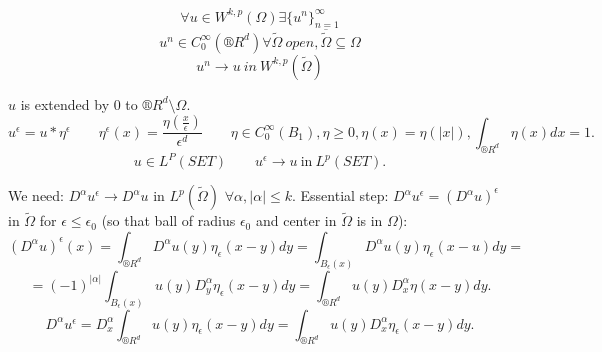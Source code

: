 \documentclass[12pt]{article}					%
\begin{document}

\begin{veta}
	$$ \forall u \in W^{k, p}(\Omega) \exists \{u^n\}_{n=1}^∞ $$
	$$ u^n \in C_0^∞(®R^d) \forall \tilde \Omega\ open, \overline{\tilde\Omega} \subseteq \Omega $$
	$$ u^n \rightarrow u\ in\ W^{k, p}(\tilde\Omega) $$

	\begin{dukazin}
		$u$ is extended by 0 to $®R^d \setminus \Omega$.
		$$ u^\epsilon = u * \eta^\epsilon \qquad \eta^\epsilon(x) = \frac{\eta(\frac{x}{\epsilon})}{\epsilon^d} \qquad \eta \in C_0^∞(B_1), \eta ≥ 0, \eta(x) = \eta(|x|), \int_{®R^d}\eta(x) dx = 1. $$
		$$ u \in L^P(SET) \qquad u^\epsilon \rightarrow u\ \text{in}\ L^p(SET). $$
		
		We need: $D^\alpha u^\epsilon \rightarrow D^\alpha u$ in $L^p(\tilde\Omega)$ $\forall \alpha, |\alpha| ≤ k$. Essential step: $D^\alpha u^\epsilon = (D^\alpha u)^\epsilon$ in $\tilde\Omega$ for $\epsilon ≤ \epsilon_0$ (so that ball of radius $\epsilon_0$ and center in $\tilde\Omega$ is in $\Omega$):
		$$ (D^\alpha u)^\epsilon(x) = \int_{®R^d} D^\alpha u(y) \eta_\epsilon(x-y) dy = \int_{B_\epsilon(x)} D^\alpha u(y) \eta_\epsilon(x - u) dy = $$
		$$ = (-1)^{|\alpha|} \int_{B_\epsilon(x)} u(y) D^\alpha_y \eta_\epsilon(x - y) dy = \int_{®R^d} u(y) D_x^\alpha \eta(x - y) dy. $$
		$$ D^\alpha u^\epsilon = D_x^\alpha \int_{®R^d} u(y) \eta_\epsilon(x - y) dy = \int_{®R^d} u(y) D_x^\alpha \eta_\epsilon(x - y) dy. $$
	\end{dukazin}
\end{veta}
\end{document}
